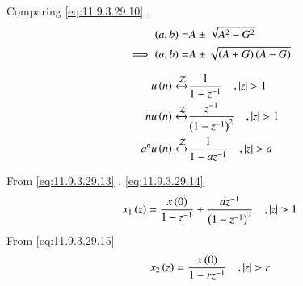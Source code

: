 \documentclass[journal,12pt,twocolumn]{IEEEtran}
\begin{document}
\noindent Comparing \eqref{eq:11.9.3.29.10} ,  
\begin{align}
\left(a,b\right) =& A \pm \sqrt{A^2 - G^2} \\
\implies \left(a,b\right) =& A \pm \sqrt{\left(A + G\right)\left(A - G\right)}
\end{align}

\begin{align}
u\left(n\right) \xleftrightarrow{\mathcal{Z}} &\frac{1}{1 - z^{-1}} \quad , \left\vert z\right\vert > 1  \label{eq:11.9.3.29.13}\\
nu\left(n\right) \xleftrightarrow{\mathcal{Z}} &\frac{z^{-1}}{\left(1 - z^{-1}\right)^2} \quad , \left\vert z\right\vert > 1  \label{eq:11.9.3.29.14}\\
a^{n}u\left(n\right) \xleftrightarrow{\mathcal{Z}} &\frac{1}{1 - az^{-1}} \quad , \left\vert z\right\vert > a \label{eq:11.9.3.29.15}
\end{align}

From  \eqref{eq:11.9.3.29.13} , \eqref{eq:11.9.3.29.14}
\begin{align}
x_1\left(z\right) = \frac{x\left(0\right)}{1 - z^{-1}} + \frac{dz^{-1}}{\left(1 - z^{-1}\right)^2} \quad , \left\vert z\right\vert > 1 
\end{align}
From \eqref{eq:11.9.3.29.15}
\begin{align}
x_2\left(z\right) = \frac{x\left(0\right)}{1 - rz^{-1}} \quad , \left\vert z\right\vert > r
\end{align}




\end{document}
